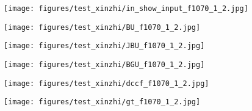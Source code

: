 \documentclass[runningheads]{llncs}
\begin{document}
    









    \begin{figure*}[!thb]
        \centering

        \begin{subfigure}[t]{0.15\linewidth}
            \centering
            \texttt{[image: figures/test\_xinzhi/in\_show\_input\_f1070\_1\_2.jpg]}
        \end{subfigure}
        \begin{subfigure}[t]{0.15\linewidth}
            \centering
            \texttt{[image: figures/test\_xinzhi/BU\_f1070\_1\_2.jpg]}
        \end{subfigure}
        \begin{subfigure}[t]{0.15\linewidth}
            \centering
            \texttt{[image: figures/test\_xinzhi/JBU\_f1070\_1\_2.jpg]}
        \end{subfigure}
        \begin{subfigure}[t]{0.15\linewidth}
            \centering
            \texttt{[image: figures/test\_xinzhi/BGU\_f1070\_1\_2.jpg]}
        \end{subfigure}
        \begin{subfigure}[t]{0.15\linewidth}
            \centering
            \texttt{[image: figures/test\_xinzhi/dccf\_f1070\_1\_2.jpg]}
        \end{subfigure}
        \begin{subfigure}[t]{0.15\linewidth}
            \centering
            \texttt{[image: figures/test\_xinzhi/gt\_f1070\_1\_2.jpg]}
        \end{subfigure}




\end{figure*}
\end{document}
